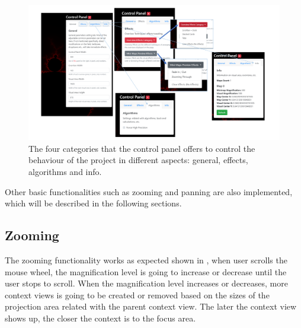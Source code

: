 \begin{figure}[H]
\centering
\includegraphics[width=\textwidth,keepaspectratio]{Figures/Chapter5/fourcate.png}
\decoRule
\caption[The Four Categories of the Control Panel]{The four categories that the control panel offers to control the behaviour of the project in different aspects: general, effects, algorithms and info.}
\label{fig:chap5:fourcate}
\end{figure}

Other basic functionalities such as zooming and panning are also implemented, which will be described in the following sections.

\subsection{Zooming}

The zooming functionality works as expected shown in , when user scrolls the mouse wheel, the magnification level is going to increase or decrease until the user stops to scroll. When the magnification level increases or decreases, more context views is going to be created or removed based on the sizes of the projection area related with the parent context view. The later the context view shows up, the closer the context is to the focus area.

